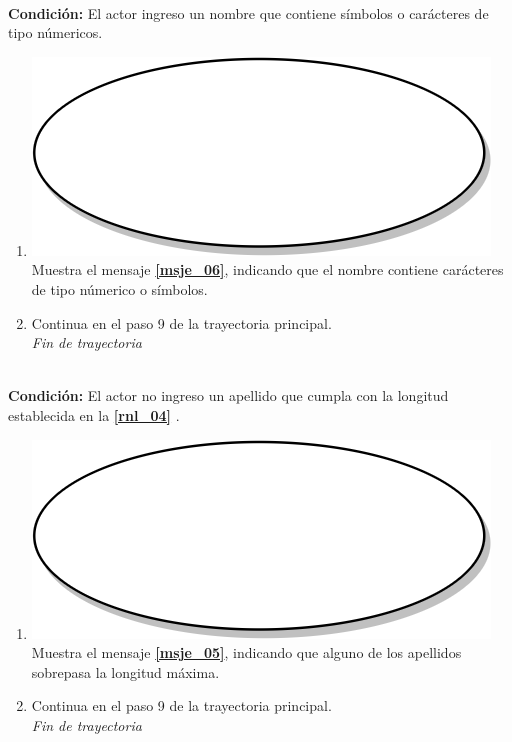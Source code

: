 \textbf{} \\
\textbf{Condición:} El actor ingreso un nombre que contiene símbolos o carácteres de tipo númericos.\\
 \begin{enumerate}[label=C\arabic*]
    \item {\includegraphics[scale=.05]{Capitulo3/img/proceso.png} Muestra el mensaje \textbf{\ref{msje_06}}, indicando que el nombre contiene carácteres de tipo númerico o símbolos.}
    \item {Continua en el paso 9 de la trayectoria principal.} \\
    \textit{Fin de trayectoria} \\
\end{enumerate}

\textbf{} \\
\textbf{Condición:} El actor no ingreso un apellido que cumpla con la longitud establecida en la \textbf{\ref{rnl_04}} .\\
 \begin{enumerate}[label=D\arabic*]
    \item {\includegraphics[scale=.05]{Capitulo3/img/proceso.png} Muestra el mensaje \textbf{\ref{msje_05}}, indicando que alguno de los apellidos sobrepasa la longitud máxima.}
    \item {Continua en el paso 9 de la trayectoria principal.} \\
    \textit{Fin de trayectoria} \\
\end{enumerate}

